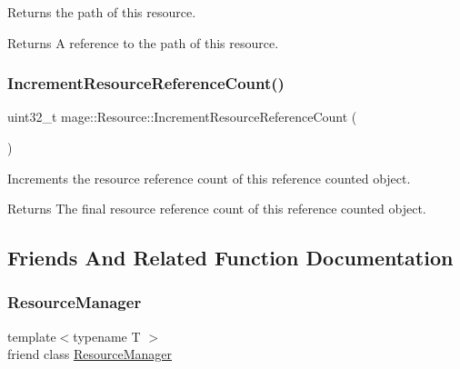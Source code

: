 Returns the path of this resource.

\begin{DoxyReturn}{Returns}
A reference to the path of this resource. 
\end{DoxyReturn}
\hypertarget{classmage_1_1_resource_a0aee4b36717494677dbd6ba799f11ab4}{}\label{classmage_1_1_resource_a0aee4b36717494677dbd6ba799f11ab4} 
\subsubsection{\texorpdfstring{Increment\+Resource\+Reference\+Count()}{IncrementResourceReferenceCount()}}
{\footnotesize\ttfamily uint32\+\_\+t mage\+::\+Resource\+::\+Increment\+Resource\+Reference\+Count (\begin{DoxyParamCaption}{ }\end{DoxyParamCaption})\hspace{0.3cm}{\ttfamily [private]}}

Increments the resource reference count of this reference counted object.

\begin{DoxyReturn}{Returns}
The final resource reference count of this reference counted object. 
\end{DoxyReturn}


\subsection{Friends And Related Function Documentation}
\hypertarget{classmage_1_1_resource_a51a7bf7c13d389aeee09c16059ca41c9}{}\label{classmage_1_1_resource_a51a7bf7c13d389aeee09c16059ca41c9} 
\subsubsection{\texorpdfstring{Resource\+Manager}{ResourceManager}}
{\footnotesize\ttfamily template$<$typename T $>$ \\
friend class \hyperlink{classmage_1_1_resource_manager}{Resource\+Manager}\hspace{0.3cm}{\ttfamily [friend]}}



